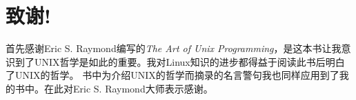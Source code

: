 \chapter*{致谢!}

首先感谢Eric S. Raymond编写的\textit{The Art of Unix Programming}，是这本书让我意识到了UNIX哲学是如此的重要。我对Linux知识的进步都得益于阅读此书后明白了UNIX的哲学。
书中为介绍UNIX的哲学而摘录的名言警句我也同样应用到了我的书中。在此对Eric S. Raymond大师表示感谢。

\newpage\thispagestyle{empty}